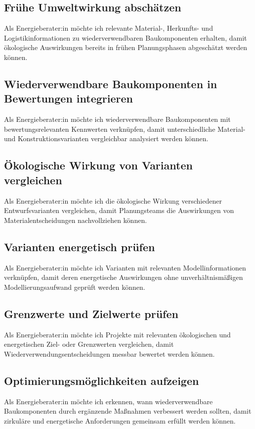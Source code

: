 
\subsection{Frühe Umweltwirkung abschätzen}
\label{us:e-01} Als Energieberater:in möchte ich relevante Material-, Herkunfts- und Logistikinformationen zu wiederverwendbaren Baukomponenten erhalten, damit ökologische Auswirkungen bereits in frühen Planungsphasen abgeschätzt werden können.

\subsection{Wiederverwendbare Baukomponenten in Bewertungen integrieren}
\label{us:e-02} Als Energieberater:in möchte ich wiederverwendbare Baukomponenten mit bewertungsrelevanten Kennwerten verknüpfen, damit unterschiedliche Material- und Konstruktionsvarianten vergleichbar analysiert werden können.

\subsection{Ökologische Wirkung von Varianten vergleichen}
\label{us:e-03} Als Energieberater:in möchte ich die ökologische Wirkung verschiedener Entwurfsvarianten vergleichen, damit Planungsteams die Auswirkungen von Materialentscheidungen nachvollziehen können.

\subsection{Varianten energetisch prüfen}
\label{us:e-04} Als Energieberater:in möchte ich Varianten mit relevanten Modellinformationen verknüpfen, damit deren energetische Auswirkungen ohne unverhältnismäßigen Modellierungsaufwand geprüft werden können.

\subsection{Grenzwerte und Zielwerte prüfen}
\label{us:e-05} Als Energieberater:in möchte ich Projekte mit relevanten ökologischen und energetischen Ziel- oder Grenzwerten vergleichen, damit Wiederverwendungsentscheidungen messbar bewertet werden können.

\subsection{Optimierungsmöglichkeiten aufzeigen}
\label{us:e-06} Als Energieberater:in möchte ich erkennen, wann wiederverwendbare Baukomponenten durch ergänzende Maßnahmen verbessert werden sollten, damit zirkuläre und energetische Anforderungen gemeinsam erfüllt werden können.

